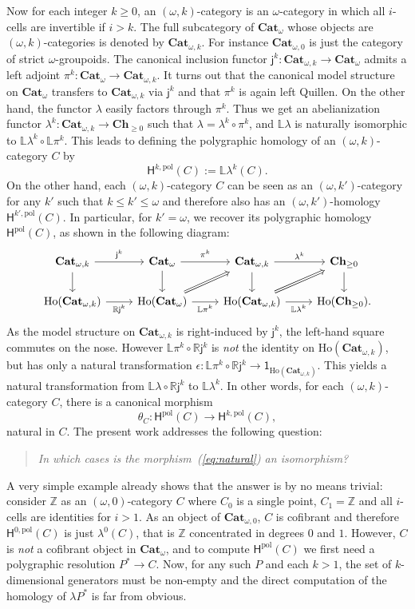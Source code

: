 \documentclass[reqno]{amsart}
\theoremstyle{plain}
\theoremstyle{definition}
\theoremstyle{remark}
\newcommand{\nmbr}[1]{\mathbb #1}
\newcommand{\Z}{\nmbr{Z}}
\newcommand{\pair}[2]{(#1,#2)}       %
\newcommand{\Unit}[1]{\mathsf{1}_{#1}}%
\newcommand{\ctg}[1]{\mathbf{#1}}  %
\newcommand{\Cat}{\ctg{Cat}}   %
\newcommand{\nCat}[1]{\Cat_{#1}}  %
\newcommand{\opCat}[1]{\Cat_{\omega,#1}} %
\newcommand{\oCat}{\nCat{\omega}} %
\newcommand{\Ch}[1]{\ctg{Ch}_{#1}} %
\newcommand{\Chp}{\Ch{\geq 0}} %
\newcommand{\functor}[1]{\mathsf{#1}} %
\newcommand{\emb}[2]{\functor{j}_{#2}^{#1}}%
\newcommand{\pifun}[2]{\functor{\pi}_{#2}^{#1}}%
\newcommand{\oemb}[1]{\emb{#1}{}}%
\newcommand{\opifun}[1]{\pifun{#1}{}}%
\newcommand{\abel}{\functor{\lambda}} %
\newcommand{\abelk}[1]{\functor{\abel}^{#1}}%
\newcommand{\homnat}{\theta}%
\newcommand{\frcat}[1]{#1^*} %
\newcommand{\oo}{\ensuremath{\omega}}
\newcommand{\ook}[1]{\ensuremath{\pair{\omega}{#1}}}
\newcommand{\Ho}{\functor{H}} %
\newcommand{\LL}{\mathbb{L}} %
\newcommand{\RR}{\mathbb{R}} %
\newcommand{\Hop}[1]{\Ho^{#1,\mathrm{pol}}} %
\newcommand{\Hopol}{\Ho^{\mathrm{pol}}}%
\newcommand{\Loc}[1]{\mathrm{Ho}(#1)} %
\begin{document}
Now for each integer $k\geq 0$, an \ook k-category is an \oo-category
in which all $i$-cells are invertible if  $i>k$. The full
subcategory of $\oCat$ whose objects are \ook k-categories is denoted
by $\opCat k$. For instance $\opCat 0$ is just the category of strict
\oo-groupoids.
The canonical inclusion functor $\oemb k:\opCat k\to\oCat$ admits a left
adjoint $\opifun k:\oCat\to\opCat k$. It turns out that the canonical model 
structure on $\oCat$ transfers to $\opCat k$ via $\oemb k$ and that
$\opifun k$ is again left Quillen. On the other hand, the functor
$\abel$ easily factors through $\opifun k$. Thus we get an
abelianization functor $\abelk k:\opCat k\to\Chp$ such that
$\abel=\abelk k\circ\opifun k$, and $\LL\abel$ is naturally isomorphic
to $\LL\abelk k\circ \LL\opifun k$. This leads to defining the
polygraphic homology of an \ook k-category $C$ by
\[\Hop{k}(C):=\LL\abelk k(C).\]
On the other hand, each \ook k-category $C$ can be seen as an \ook
{k'}-category for any $k'$ such that $k\leq k'\leq \oo$ and therefore also has an \ook{k'}-homology $\Hop{k'\!}(C)$. In particular, for
$k'=\oo$, we recover its polygraphic homology $\Hopol(C)$, as shown in 
the following diagram:
\[
  \begin{tikzcd}
    \opCat k \ar[r,"\oemb k"]\ar[d]& \oCat\ar[r,"\opifun k"]\ar[d] & \opCat k\ar[r,"\abelk k"]\ar[d] & \Chp\ar[d]\\
  \Loc{\opCat k}\ar[r,"\RR\oemb k"']& \Loc{\oCat}\ar[r,"\LL\opifun k"']\ar[ru,Rightarrow] & \Loc{\opCat
  k}\ar[r,"\LL\abelk k"']\ar[ru,Rightarrow]& \Loc{\Chp}.
  \end{tikzcd}
  \]
As the model structure on $\opCat k$ is right-induced by $\oemb k$,
the left-hand square commutes on the nose. However $\LL\opifun k\circ
\RR\oemb k$ is {\em not} the identity on $\Loc{\opCat k}$, but has
only a natural transformation $\epsilon:\LL\opifun k\circ
\RR\oemb k\to \Unit{\Loc{\opCat k}}$. This yields a natural
transformation from $\LL\abel\circ\RR\oemb k$ to $\LL\abelk k$. In
other words, for each \ook k-category $C$, there is a canonical morphism
\begin{equation}
  \label{eq:natural}
  \homnat_{C}\colon\Hopol(C)\to \Hop k (C),
\end{equation}
natural in $C$.
The present work addresses the following question:
\begin{quote}
 {\em In which cases is the morphism~(\ref{eq:natural}) an isomorphism?}
\end{quote}
 A very simple example
already shows that the answer is by no means trivial: consider $\Z$ as an
\ook 0-category $C$ where $C_0$ is a single point, $C_1=\Z$ and all
$i$-cells are identities for $i>1$. As an object of $\opCat 0$, $C$ is
cofibrant and therefore $\Hop 0(C)$ is just $\abelk 0(C)$, that is
$\Z$ concentrated in degrees $0$ and $1$. However,
$C$ is {\em not} a cofibrant object in $\oCat$, and to compute
$\Hopol(C)$ we first need a polygraphic resolution $\frcat P\to C$. Now, for any such $P$ and each $k>1$, the set of $k$-dimensional
generators must be non-empty and the direct computation of the homology of
$\abel\frcat P$ is far from obvious.
\end{document}
